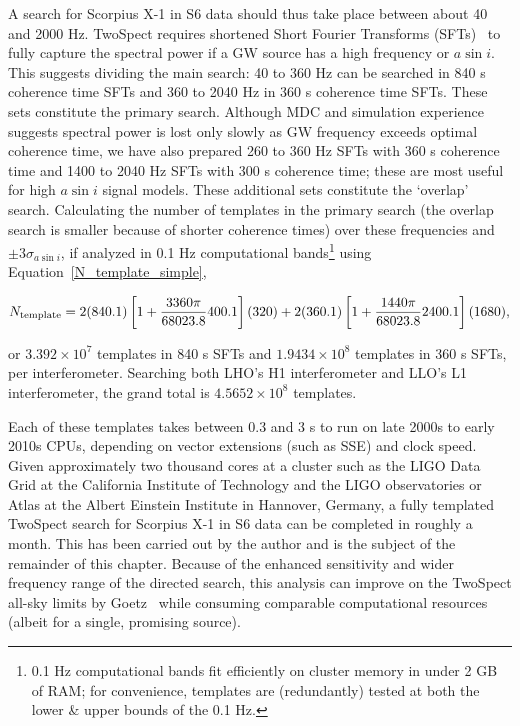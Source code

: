 A search for Scorpius X-1 in S6 data should thus take place between about 40 and 2000 Hz. 
TwoSpect requires shortened Short Fourier Transforms (SFTs)~\cite{GoetzTwoSpectMethods2011} to fully capture the spectral power if a GW source has a high frequency or $a \sin i$. 
This suggests dividing the main search: 40 to 360 Hz can be searched in 840 s coherence time SFTs and 360 to 2040 Hz in 360 s coherence time SFTs.
These sets constitute the primary search.
Although MDC and simulation experience suggests spectral power is lost only slowly as GW frequency exceeds optimal coherence time, we have also prepared 260 to 360 Hz SFTs with 360 s coherence time and 1400 to 2040 Hz SFTs with 300 s coherence time; these are most useful for high $a \sin i$ signal models.
These additional sets constitute the `overlap' search.
Calculating the number of templates in the primary search (the overlap search is smaller because of shorter coherence times) over these frequencies and $\pm 3 \sigma_{a \sin i}$, if analyzed in 0.1 Hz computational bands\footnote{0.1 Hz computational bands fit efficiently on cluster memory in under 2 GB of RAM; for convenience, templates are (redundantly) tested at both the lower \& upper bounds of the 0.1 Hz.} using Equation~\ref{N_template_simple},

\begin{equation}
N_\textup{template} = 2 (840.1)\left[1+ \frac{3360\pi}{68023.8} 400.1 \right](320) + 2 (360.1)\left[1+ \frac{1440\pi}{68023.8}2400.1\right](1680),
\label{S6_N_templates}
\end{equation}

\noindent or $3.392\times 10^7$ templates in 840 s SFTs and $1.9434\times 10^8$ templates in 360 s SFTs, per interferometer.
Searching both LHO's H1 interferometer and LLO's L1 interferometer, the grand total is $4.5652\times10^8$ templates.

Each of these templates takes between 0.3 and 3 s to run on late 2000s to early 2010s CPUs, depending on vector extensions (such as SSE) and clock speed.
Given approximately two thousand cores at a cluster such as the LIGO Data Grid at the California Institute of Technology and the LIGO observatories or Atlas at the Albert Einstein Institute in Hannover, Germany, a fully templated TwoSpect search for Scorpius X-1 in S6 data can be completed in roughly a month.
This has been carried out by the author and is the subject of the remainder of this chapter.
Because of the enhanced sensitivity and wider frequency range of the directed search, this analysis can improve on the TwoSpect all-sky limits by Goetz~\cite{GoetzTwoSpectResults2014} while consuming comparable computational resources (albeit for a single, promising source).

